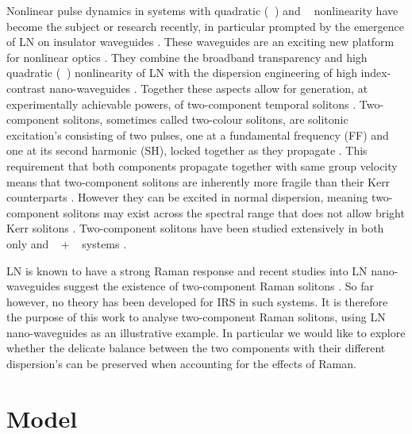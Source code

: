 \documentclass[reprint,
 amsmath,amssymb,
 pra,
]{revtex4-1}
\DeclareMathOperator{\chitwo}{ {\chi}^{(2)} }
\DeclareMathOperator{\chithree}{ {\chi}^{(3)} }
\begin{document}
Nonlinear pulse dynamics in systems with quadratic ($\chitwo$) and $\chithree$ nonlinearity have become the subject or research recently, in particular prompted by the emergence of LN on insulator waveguides \cite{Guo2015SupercontinuumMatching, Phillips2011SupercontinuumWaveguides, Guo2013NonlinearMedia}.
These waveguides are an exciting new platform for nonlinear optics \cite{Poberaj2012LithiumDevices, Boes2018StatusCircuits}. They combine the broadband transparency and high quadratic ($\chitwo$) nonlinearity of LN with the dispersion engineering of high index-contrast nano-waveguides \cite{Poberaj2012LithiumDevices, Boes2018StatusCircuits}. Together these aspects allow for generation, at experimentally achievable powers, of two-component temporal solitons \cite{Rowe2019TemporalNanowaveguides}. Two-component solitons, sometimes called two-colour solitons, are solitonic excitation's consisting of two pulses, one at a fundamental frequency (FF) and one at its second harmonic (SH), locked together as they propagate \cite{Buryak2002}. This requirement that both components propagate together with same group velocity means that two-component solitons are inherently more fragile than their Kerr counterparts \cite{Buryak2002, Rowe2019TemporalNanowaveguides}. However they can be excited in normal dispersion, meaning two-component solitons may exist across the spectral range that does not allow  bright Kerr solitons \cite{Buryak2002, Rowe2019TemporalNanowaveguides}. Two-component solitons have been studied extensively in both $\chitwo$ only and $\chitwo + \chithree$ systems \cite{Schiek1993NonlinearStructures, Buryak2002, Buryak1995OpticalNonlinearities}. 

LN is known to have a strong Raman response \cite{Bache2012ReviewResponse} and recent studies into LN nano-waveguides suggest the existence of two-component Raman solitons \cite{Guo2015SupercontinuumMatching, Phillips2011SupercontinuumWaveguides, Guo2013NonlinearMedia}. So far however, no theory has been developed for IRS in such systems. It is therefore the purpose of this work to analyse two-component Raman solitons, using LN nano-waveguides as an illustrative example. In particular we would like to explore whether the delicate balance between the two components with their different dispersion's can be preserved when accounting for the effects of Raman. 

\section{Model}
\end{document}
